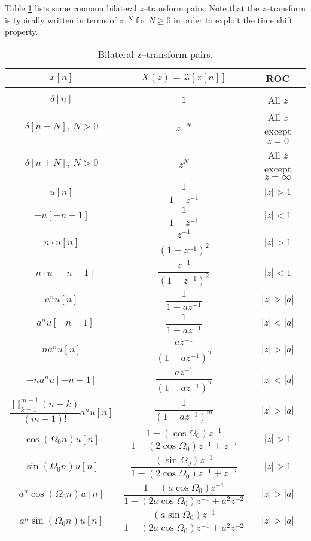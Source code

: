 \documentclass{report}
\begin{document}
Table \ref{z_pairs} lists some common bilateral $z$--transform pairs. Note that the $z$--transform is typically written in terms of $z^{-N}$ for $N\geq 0$ in order to exploit the time shift property.
\begin{table}[hbt!]
    \centering
    \caption{Bilateral z--transform pairs.}
    \label{z_pairs}
    \begin{tabular}{|c|c|c|}
        \hline
        $x[n]$ & $X(z)=\mathcal{Z}[x[n]]$ & ROC \\[0.15cm]
        \hline
        & & \\[0.1cm]
        $\delta[n]$ & $1$ & All $z$ \\[0.5cm]
        $\delta[n-N],\, N>0$ & $z^{-N}$ & All $z$ except $z=0$ \\[0.5cm]
        $\delta[n+N],\, N>0$ & $z^N$ & All $z$ except $z=\infty$ \\[0.5cm]
        $u[n]$ & $\dfrac{1}{1-z^{-1}}$ & $|z|>1$ \\[0.5cm]
        $-u[-n-1]$ & $\dfrac{1}{1-z^{-1}}$ & $|z|<1$ \\[0.5cm]
        $n\cdot u[n]$ & $\dfrac{z^{-1}}{(1-z^{-1})^2}$ & $|z|>1$ \\[0.5cm]
        $-n\cdot u[-n-1]$ & $\dfrac{z^{-1}}{(1-z^{-1})^2}$ & $|z|<1$ \\[0.5cm]
        $a^n u[n]$ & $\dfrac{1}{1-az^{-1}}$ & $|z|>|a|$ \\[0.5cm]
        $-a^n u[-n-1]$ & $\dfrac{1}{1-az^{-1}}$ & $|z|<|a|$ \\[0.5cm]
        $na^n u[n]$ & $\dfrac{az^{-1}}{(1-az^{-1})^2}$ & $|z|>|a|$ \\[0.5cm]
        $-na^n u[-n-1]$ & $\dfrac{az^{-1}}{(1-az^{-1})^2}$ & $|z|<|a|$ \\[0.5cm]
        $\dfrac{\prod_{k=1}^{m-1}(n+k)}{(m-1)!}a^n u[n]$ & $\dfrac{1}{(1-az^{-1})^m}$ & $|z|>|a|$ \\[0.5cm]
        $\cos(\Omega_0 n)u[n]$ & $\dfrac{1-(\cos\Omega_0)z^{-1}}{1-(2\cos\Omega_0)z^{-1}+z^{-2}}$ & $|z|>1$ \\[0.5cm]
        $\sin(\Omega_0 n)u[n]$ & $\dfrac{(\sin\Omega_0)z^{-1}}{1-(2\cos\Omega_0)z^{-1}+z^{-2}}$ & $|z|>1$ \\[0.5cm]
        $a^n\cos(\Omega_0 n)u[n]$ & $\dfrac{1-(a\cos\Omega_0)z^{-1}}{1-(2a\cos\Omega_0)z^{-1}+a^2z^{-2}}$ & $|z|>|a|$ \\[0.5cm]
        $a^n\sin(\Omega_0 n)u[n]$ & $\dfrac{(a\sin\Omega_0)z^{-1}}{1-(2a\cos\Omega_0)z^{-1}+a^2z^{-2}}$ & $|z|>|a|$ \\[0.5cm]
        \hline
    \end{tabular}
\end{table}
\end{document}
